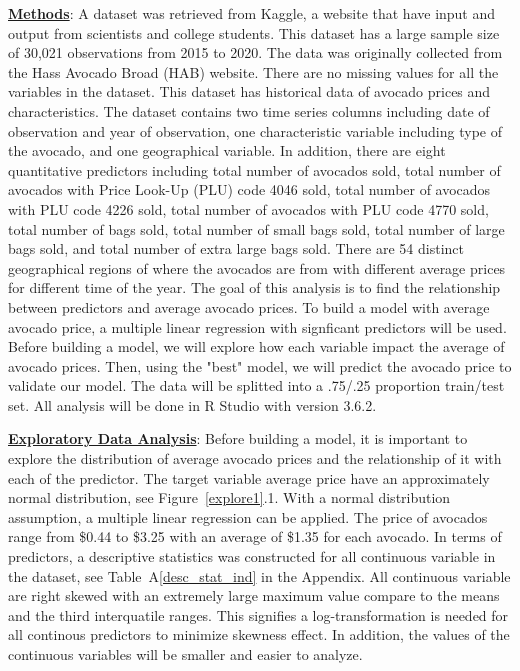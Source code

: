\documentclass[11pt]{article}\usepackage[]{graphicx}\usepackage[]{color}
\begin{document}
\noindent\textbf{\underline{Methods}}: A dataset was retrieved from Kaggle, a website that have input and output from scientists and college students. This dataset has a large sample size of 30,021 observations from 2015 to 2020. The data was originally collected from the Hass Avocado Broad (HAB) website. There are no missing values for all the variables in the dataset. This dataset has historical data of avocado prices and characteristics. The dataset contains two time series columns including date of observation and year of observation, one characteristic variable including type of the avocado, and one geographical variable. In addition, there are eight quantitative predictors including total number of avocados sold, total number of avocados with Price Look-Up (PLU) code 4046 sold, total number of avocados with PLU code 4226 sold, total number of avocados with PLU code 4770 sold, total number of bags sold, total number of small bags sold, total number of large bags sold, and total number of extra large bags sold. There are 54 distinct geographical regions of where the avocados are from with different average prices for different time of the year. The goal of this analysis is to find the relationship between predictors and average avocado prices. To build a model with average avocado price, a multiple linear regression with signficant predictors will be used. Before building a model, we will explore how each variable impact the average of avocado prices. Then, using the "best" model, we will predict the avocado price to validate our model. The data will be splitted into a .75/.25 proportion train/test set. All analysis will be done in R Studio with version 3.6.2.  
\hfill \break

\noindent\textbf{\underline{Exploratory Data Analysis}}: Before building a model, it is important to explore the distribution of average avocado prices and the relationship of it with each of the predictor. The target variable average price have an approximately normal distribution, see Figure~\ref{explore1}.1. With a normal distribution assumption, a multiple linear regression can be applied. The price of avocados range from \$0.44 to \$3.25 with an average of \$1.35 for each avocado. In terms of predictors, a descriptive statistics was constructed for all continuous variable in the dataset, see Table~A\ref{desc_stat_ind} in the Appendix. All continuous variable are right skewed with an extremely large maximum value compare to the means and the third interquatile ranges. This signifies a log-transformation is needed for all continous predictors to minimize skewness effect. In addition, the values of the continuous variables will be smaller and easier to analyze.      
\end{document}
